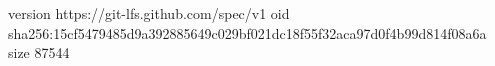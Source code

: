 version https://git-lfs.github.com/spec/v1
oid sha256:15cf5479485d9a392885649c029bf021dc18f55f32aca97d0f4b99d814f08a6a
size 87544
